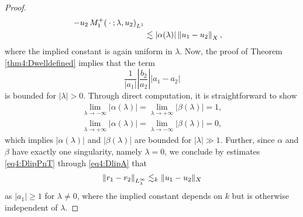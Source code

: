 \documentclass[../dissertation.tex]{subfiles}
\begin{document}
\begin{proof}
\begin{align}
{					- u_2 \, M_1^+(\kern 0.5ex \cdot \kern 0.5ex; \lambda, u_2)
				}_{L^1} 
				\\
			&\lesssim |\alpha(\lambda)| \left\| u_1 - u_2 \right\|_X,
				\nonumber
	\end{align}
	where the implied constant is again uniform in $\lambda$.
	Now, the proof of Theorem \ref{thm4:Dwelldefined} implies 
	that the term
	\[
		\frac{1}{|a_1|} \left| \frac{b_2}{a_2} \right| |a_1 - a_2|
	\]
	is bounded for $|\lambda| > 0$. Through direct computation,
	it is straightforward to show 
	\begin{align*}
		\lim_{\lambda \to -\infty} |\alpha(\lambda)| 
			= \lim_{\lambda \to +\infty} |\beta(\lambda)| 
			= 1, 
			\\
		\lim_{\lambda \to +\infty} |\alpha(\lambda)| 
			= \lim_{\lambda \to -\infty} |\beta(\lambda)| 
			= 0,  
	\end{align*}
	which implies $|\alpha(\lambda)|$ and $|\beta(\lambda)|$ are bounded for 
	$|\lambda| \gg 1$. Further, since $\alpha$ and $\beta$ have exactly one 
	singularity, namely $\lambda = 0$, we conclude by estimates 
	\eqref{eq4:DlipPnT} through \eqref{eq4:DlipA} that
	\begin{align}\label{eq4:DlipFinal}
		\left\| r_1 - r_2 \right\|_{L_\lambda^\infty}
			\lesssim_k \|u_1 - u_2\|_X
	\end{align}
	as $|a_1| \geq 1$ for $\lambda \ne 0$, where the implied constant depends 
	on $k$ but is otherwise independent of $\lambda$.
\end{proof}
\end{document}
